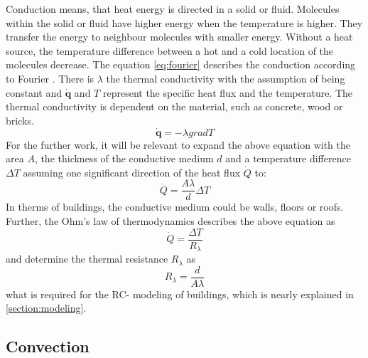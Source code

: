    Conduction means, that heat energy is directed in a solid or fluid. Molecules within the solid or fluid have higher energy when the temperature is higher. They transfer the energy to neighbour molecules with smaller energy. Without a heat source, the temperature difference between a hot and a cold location of the molecules decrease.\cite{Kuchling.2007}
    \newline The equation \ref{eq:fourier} describes the conduction according to Fourier \cite{.2013}. There is $\lambda$ the thermal conductivity with the assumption of being constant and $\dot{\textbf{q}}$ and $T$ represent the specific heat flux and the temperature. The thermal conductivity is dependent on the material, such as concrete, wood or bricks. 
    \begin{equation}
    \label{eq:fourier}
        \dot{\textbf{q}} = - \lambda grad T
    \end{equation}
    For the further work, it will be relevant to expand the above equation with the area $A$, the thickness of the conductive medium $d$ and a temperature difference $\Delta T$ assuming one significant direction of the heat flux $\dot{Q}$ to:
    \begin{equation}
    \label{eq:conduction}
        \dot{Q} = \frac{A\lambda}{d} \Delta T
    \end{equation}
    In therms of buildings, the conductive medium could be walls, floors or roofs.
    \newline
    Further, the Ohm's law of thermodynamics describes the above equation as 
     \begin{equation}
    \label{eq:conduction}
        \dot{Q} = \frac{\Delta T}{R_\lambda} 
    \end{equation}
    and determine the thermal resistance $R_\lambda$ as
    \cite{Kuchling.2007}
    \begin{equation}
    \label{eq:r_lambda}
        R_\lambda = \frac{d}{A\lambda}
    \end{equation}
    what is required for the RC- modeling of buildings, which is nearly explained in \ref{section:modeling}.

\subsection{Convection}
\label{subsection:convection}

